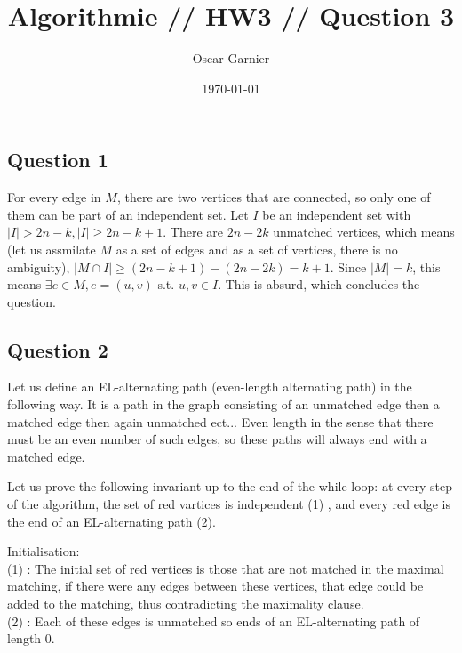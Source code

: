 \documentclass{scrartcl}
\title{Algorithmie // HW3 // Question 3}
\author{Oscar Garnier}
\date{\today}
\begin{document}
\newcommand{\E}[1]{\section*{Exo #1}}
\newcommand{\CR}[2]{\section*{#1 // note : #2}}
\newcommand{\Q}[1]{\section*{Exercise #1}}
\newcommand{\SQ}[1]{\subsection*{Question #1}}
\maketitle


\SQ{1}
For every edge in \( M \), there are two vertices that are connected, so only one of them can be part of an independent set. 
Let \( I \) be an independent set with \( |I| > 2n - k, |I| \geq 2n - k + 1 \). There are \( 2n - 2k \) unmatched vertices, which means (let us assmilate \( M \) as a set of edges and as a set of vertices, there is no ambiguity), \( |M \cap I| \geq (2n - k + 1) - (2n - 2k) = k + 1 \). Since \( |M| = k \), this means \( \exists e \in M, e = (u,v) \)  s.t. \( u,v \in I \). 
This is absurd, which concludes the question.

\SQ{2}
Let us define an EL-alternating path (even-length alternating path) in the following way. It is a path in the graph consisting of an unmatched edge then a matched edge then again unmatched ect... Even length in the sense that there must be an even number of such edges, so these paths will always end with a matched edge.

Let us prove the following invariant up to the end of the while loop: at every step of the algorithm, the set of red vartices is independent (1) , and every red edge is the end of an EL-alternating path (2).

Initialisation: \\
(1) : The initial set of red vertices is those that are not matched in the maximal matching, if there were any edges between these vertices, that edge could be added to the matching, thus contradicting the maximality clause. \\
(2) : Each of these edges is unmatched so ends of an EL-alternating path of length 0. \\
\end{document}
